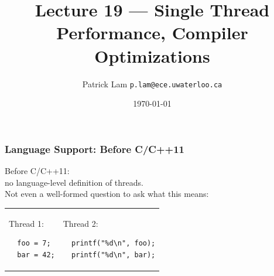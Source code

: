 

\title{Lecture 19 --- Single Thread Performance, Compiler Optimizations}

\author{Patrick Lam \small \texttt{p.lam@ece.uwaterloo.ca}}
\date{\today}




\begin{frame}
  \titlepage

 \end{frame}

\begin{frame}[fragile]
  \frametitle{Language Support: Before C/C++11}


  
    Before C/C++11: \\ \qquad no language-level definition of threads.\\[1em]

    Not even a well-formed question to ask what this means:\\[.5em]
    \begin{tabular}{ll}
      \begin{minipage}{.2\textwidth}
        Thread 1:
        \begin{lstlisting}
  foo = 7;
  bar = 42;
        \end{lstlisting}
      \end{minipage} &
      \begin{minipage}{.4\textwidth}
        Thread 2:
        \begin{lstlisting}
  printf("%d\n", foo);
  printf("%d\n", bar);
        \end{lstlisting}
      \end{minipage}
    \end{tabular}
    ~\\[1em]
    
  
\end{frame}

